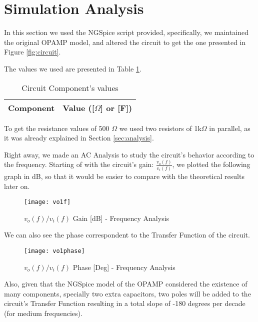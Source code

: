 \section{Simulation Analysis}
\label{sec:simulation}
In this section we used the NGSpice script provided, specifically, we maintained the original OPAMP model, and altered the circuit to get the one presented in Figure \ref{fig:circuit}.

The values we used are presented in Table \ref{tab:ngspice1}.

\FloatBarrier
\begin{table}[ht]
	\centering
	\begin{tabular}{|c|c|}
		\hline    
		{\bf Component} & {\bf Value ([$\Omega$] or [F])} \\ \hline
				
	\end{tabular}
	\caption{Circuit Component's values}
	\label{tab:ngspice1}
\end{table}
\FloatBarrier

To get the resistance values of 500 $\Omega$ we used two resistors of 1k$\Omega$ in parallel, as it was already explained in Section \ref{sec:analysis}.

Right away, we made an AC Analysis to study the circuit's behavior according to the frequency. 
Starting of with the circuit's gain: $\frac{v_o(f)}{v_i(f)}$, we plotted the following graph in dB, so that it would be easier to compare with the theoretical results later on.

\FloatBarrier
\begin{figure}[h] 
	\centering
	\texttt{[image: vo1f]}
	\caption{$v_o(f)/v_i(f)$ Gain [dB] - Frequency Analysis}
	\label{fig:vo1f}
\end{figure}
\FloatBarrier

We can also see the phase correspondent to the Transfer Function of the circuit. 
\FloatBarrier
\begin{figure}[h] 
	\centering
	\texttt{[image: vo1phase]}
	\caption{$v_o(f)/v_i(f)$ Phase [Deg] - Frequency Analysis}
	\label{fig:vo1p}
\end{figure}
\FloatBarrier


 Also, given that the NGSpice model of the OPAMP considered the existence of many components, specially two extra capacitors,  two poles will be added to the circuit's Transfer Function resulting in a total slope of -180 degrees per decade (for medium frequencies).
 
